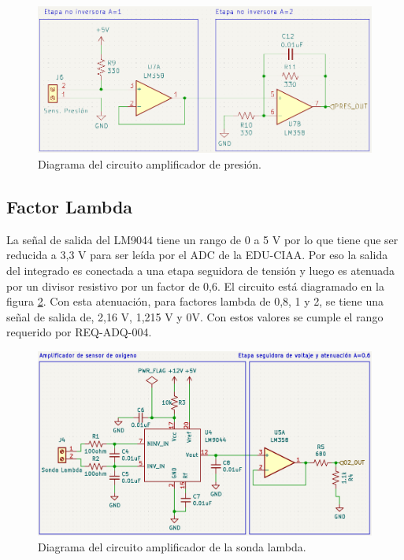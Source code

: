 \begin{figure}[htpb]
\centering
\includegraphics[width=.9\textwidth]{./Figures/circuito-presion.png}
\caption{Diagrama del circuito amplificador de presión.}
\label{fig:circuito-presion}
\end{figure}

\subsection{Factor Lambda}

La señal de salida del LM9044 tiene un rango de 0 a 5 V por lo que tiene que ser reducida a 3,3 V para ser leída por el ADC de la EDU-CIAA. Por eso la salida del integrado es conectada a una etapa seguidora de tensión y luego es atenuada por un divisor resistivo por un factor de 0,6. El circuito está diagramado en la figura \ref{fig:circuito-o2}. Con esta atenuación, para factores lambda de 0,8, 1 y 2, se tiene una señal de salida de, 2,16 V, 1,215 V y 0V. Con estos valores se cumple el rango requerido por REQ-ADQ-004.

\begin{figure}[htpb]
\centering
\includegraphics[width=\textwidth]{./Figures/ampli-o2.png}
\caption{Diagrama del circuito amplificador de la sonda lambda.}
\label{fig:circuito-o2}
\end{figure}

